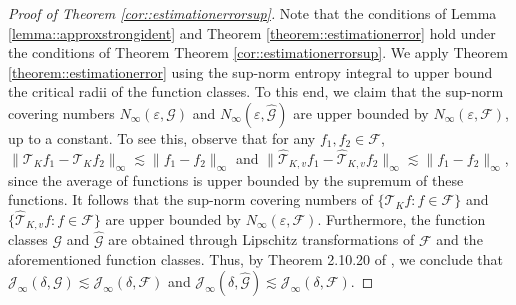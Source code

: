 \documentclass[11pt]{article}
\theoremstyle{plain}
\theoremstyle{definition}
\theoremstyle{remark}
\theoremstyle{definition}
\begin{document}
 \begin{proof}[Proof of Theorem \ref{cor::estimationerrorsup}]
  Note that the conditions of Lemma \ref{lemma::approxstrongident} and Theorem \ref{theorem::estimationerror}  hold under the conditions of Theorem Theorem \ref{cor::estimationerrorsup}. We apply Theorem \ref{theorem::estimationerror} using the sup-norm entropy integral to upper bound the critical radii of the function classes. To this end, we claim that the sup-norm covering numbers \(N_{\infty}(\varepsilon, \mathcal{G})\) and \(N_{\infty}(\varepsilon, \widehat{\mathcal{G}})\) are upper bounded by \(N_{\infty}(\varepsilon, \mathcal{F})\), up to a constant. To see this, observe that for any \(f_1, f_2 \in \mathcal{F}\),
\(\|\mathcal{T}_{K}f_1 - \mathcal{T}_{K}f_2\|_{\infty} \lesssim \|f_1 - f_2\|_{\infty}\)
and
\(\|\widehat{\mathcal{T}}_{K,v}f_1 - \widehat{\mathcal{T}}_{K,v}f_2\|_{\infty} \lesssim \|f_1 - f_2\|_{\infty}\),
since the average of functions is upper bounded by the supremum of these functions. It follows that the sup-norm covering numbers of \(\{\mathcal{T}_{K}f: f \in \mathcal{F}\}\) and \(\{\widehat{\mathcal{T}}_{K,v}f: f \in \mathcal{F}\}\) are upper bounded by \(N_{\infty}(\varepsilon, \mathcal{F})\). Furthermore, the function classes \(\mathcal{G}\) and \(\widehat{\mathcal{G}}\) are obtained through Lipschitz transformations of \(\mathcal{F}\) and the aforementioned function classes. Thus, by Theorem 2.10.20 of \cite{vanderVaartWellner}, we conclude that
\(\mathcal{J}_{\infty}(\delta, \mathcal{G}) \lesssim \mathcal{J}_{\infty}(\delta, \mathcal{F})\)
and
\(\mathcal{J}_{\infty}(\delta, \widehat{\mathcal{G}}) \lesssim \mathcal{J}_{\infty}(\delta, \mathcal{F})\).



\end{proof}
\end{document}
